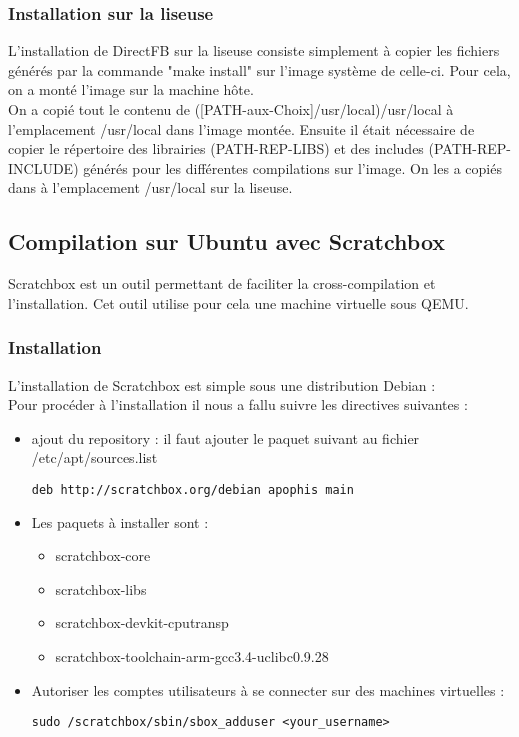 \subsubsection{Installation sur la liseuse}


L'installation de DirectFB sur la liseuse consiste simplement à copier les fichiers générés par la commande "make install" sur l'image système de celle-ci. Pour cela, on a monté l'image sur la machine hôte. \\
On a copié tout le contenu de ([PATH-aux-Choix]/usr/local)/usr/local à l'emplacement /usr/local dans l'image montée. Ensuite il était nécessaire de copier le répertoire des librairies (PATH-REP-LIBS) et des includes (PATH-REP-INCLUDE) générés pour les différentes compilations sur l'image. On les a copiés dans à l'emplacement /usr/local sur la liseuse. 

\newpage

\subsection{Compilation sur Ubuntu avec Scratchbox}

Scratchbox est un outil permettant de faciliter la cross-compilation et l'installation. Cet outil utilise pour cela une machine virtuelle sous QEMU.

\subsubsection{Installation}

L'installation de Scratchbox est simple sous une distribution Debian : \\
Pour procéder à l'installation il nous a fallu suivre les directives suivantes :
\begin{itemize}
	\item ajout du repository :
		il faut ajouter le paquet suivant au fichier /etc/apt/sources.list
		\begin{lstlisting}
deb http://scratchbox.org/debian apophis main
		\end{lstlisting}
	\item 
		Les paquets à installer sont :
			\begin{itemize}
				\item scratchbox-core
				\item scratchbox-libs
				\item scratchbox-devkit-cputransp
				\item scratchbox-toolchain-arm-gcc3.4-uclibc0.9.28
			\end{itemize}
	\item Autoriser les comptes utilisateurs à se connecter sur des machines virtuelles : 
	\begin{lstlisting}
sudo /scratchbox/sbin/sbox_adduser <your_username>
	\end{lstlisting}	
\end{itemize}

